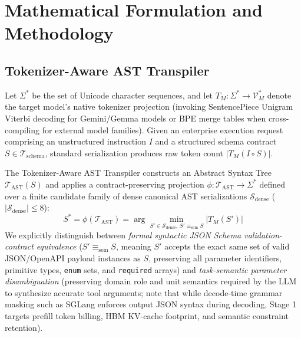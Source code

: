 \documentclass[conference,10pt]{IEEEtran}
\begin{document}
\section{Mathematical Formulation and Methodology}
\label{sec:methodology}

\subsection{Tokenizer-Aware AST Transpiler}
Let $\Sigma^*$ be the set of Unicode character sequences, and let $T_M : \Sigma^* \to \mathcal{V}_M^*$ denote the target model's native tokenizer projection (invoking SentencePiece Unigram Viterbi decoding for Gemini/Gemma models \cite{kudo2018unigram, gemini2024} or BPE merge tables when cross-compiling for external model families). Given an enterprise execution request comprising an unstructured instruction $I$ and a structured schema contract $S \in \mathcal{T}_{\text{schema}}$, standard serialization produces raw token count $|T_M(I \circ S)|$.

The Tokenizer-Aware AST Transpiler constructs an Abstract Syntax Tree $\mathcal{T}_{\text{AST}}(S)$ and applies a contract-preserving projection $\phi : \mathcal{T}_{\text{AST}} \to \Sigma^*$ defined over a finite candidate family of dense canonical AST serializations $\mathcal{S}_{\text{dense}}$ ($|\mathcal{S}_{\text{dense}}| \le 8$):
\begin{equation}
\label{eq:ast_min}
S^* = \phi(\mathcal{T}_{\text{AST}}) = \arg\min_{S' \in \mathcal{S}_{\text{dense}},\, S' \equiv_{\text{sem}} S} |T_M(S')|
\end{equation}
We explicitly distinguish between \textit{formal syntactic JSON Schema validation-contract equivalence} ($S' \equiv_{\text{sem}} S$, meaning $S'$ accepts the exact same set of valid JSON/OpenAPI payload instances as $S$, preserving all parameter identifiers, primitive types, \texttt{enum} sets, and \texttt{required} arrays) and \textit{task-semantic parameter disambiguation} (preserving domain role and unit semantics required by the LLM to synthesize accurate tool arguments; note that while decode-time grammar masking such as SGLang \cite{zheng2024sglang} enforces output JSON syntax during decoding, Stage 1 targets prefill token billing, HBM KV-cache footprint, and semantic constraint retention).
\end{document}
